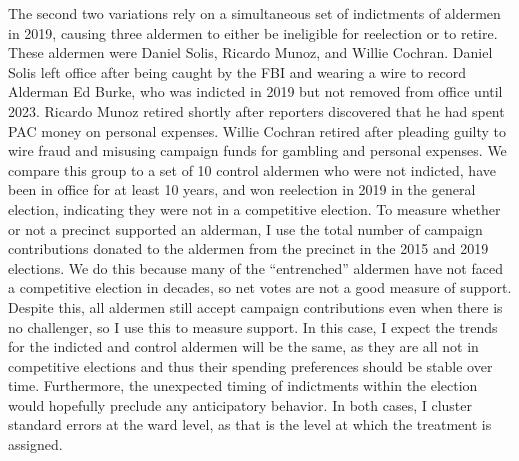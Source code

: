 The second two variations rely on a simultaneous set of indictments of aldermen in 2019, causing three aldermen to either be ineligible for reelection or to retire. 
These aldermen were Daniel Solis, Ricardo Munoz, and Willie Cochran. 
Daniel Solis left office after being caught by the FBI and wearing a wire to record Alderman Ed Burke, who was indicted in 2019 but not removed from office until 2023.
Ricardo Munoz retired shortly after reporters discovered that he had spent PAC money on personal expenses.
Willie Cochran retired after pleading guilty to wire fraud and misusing campaign funds for gambling and personal expenses.
We compare this group to a set of 10 control aldermen who were not indicted, have been in office for at least 10 years, and won reelection in 2019 in the general election, indicating they were not in a competitive election. 
To measure whether or not a precinct supported an alderman, I use the total number of campaign contributions donated to the aldermen from the precinct in the 2015 and 2019 elections.
We do this because many of the ``entrenched'' aldermen have not faced a competitive election in decades, so net votes are not a good measure of support.
Despite this, all aldermen still accept campaign contributions even when there is no challenger, so I use this to measure support.
In this case, I expect the trends for the indicted and control aldermen will be the same, as they are all not in competitive elections and thus their spending preferences should be stable over time.
Furthermore, the unexpected timing of indictments within the election would hopefully preclude any anticipatory behavior.
In both cases, I cluster standard errors at the ward level, as that is the level at which the treatment is assigned.